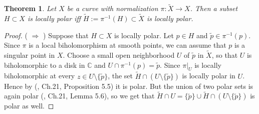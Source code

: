 \documentclass[11pt]{amsart}
\newtheorem{theorem}{Theorem}[section]
\theoremstyle{definition}
\newcommand{\bC}{{\mathbb C}}
\begin{document}
\begin{theorem}\label{thm:loc-polar-equiv}
Let $X$ be a curve with normalization $\pi:\widetilde X\rightarrow X$. Then a subset $H\subset X$ is locally polar iff  $\widetilde H:=\pi^{-1}(H)\subset\widetilde X$ is locally polar.
\end{theorem}
\begin{proof} ( $\Longrightarrow$ )
Suppose that $H\subset X$ is locally polar.
Let $p\in H$ and $\tilde p\in \pi^{-1}(p)$. Since $\pi$ is a local biholomorphism at smooth points, we can assume that $p$ is a singular point in $X$.  Choose
a small open neighborhood $U$ of $\tilde p$ in $\widetilde X$, so that $U$ is biholomorphic to a disk in $\bC$ and  $U\cap\pi^{-1}(p)=\tilde p$. Since $\left.\pi\right|_U$ is locally biholomorphic at every $z \in U \setminus \{\tilde{p}\}$, the set
$\widetilde H\cap (U\setminus\{\tilde p\})$ is locally polar in $U$. Hence by (\cite{C95}, Ch.21, Proposition 5.5) it is polar. But the union of two polar sets  is again polar (\cite{C95}, Ch.21, Lemma 5.6), so
we get that $\widetilde H\cap U=\{\tilde p\}\cup \widetilde H\cap (U\setminus \{\tilde{p}\})$ is polar as well.


\end{proof}
\end{document}
